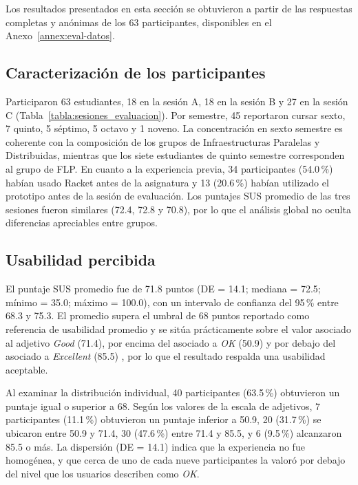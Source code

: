 Los resultados presentados en esta sección se obtuvieron a partir de las respuestas completas y anónimas de los 63 participantes, disponibles en el Anexo~\ref{annex:eval-datos}.

\subsection{Caracterización de los participantes}

Participaron 63 estudiantes, 18 en la sesión A, 18 en la sesión B y 27 en la sesión C (Tabla~\ref{tabla:sesiones_evaluacion}). Por semestre, 45 reportaron cursar sexto, 7 quinto, 5 séptimo, 5 octavo y 1 noveno. La concentración en sexto semestre es coherente con la composición de los grupos de Infraestructuras Paralelas y Distribuidas, mientras que los siete estudiantes de quinto semestre corresponden al grupo de FLP. En cuanto a la experiencia previa, 34 participantes (54.0\,\%) habían usado Racket antes de la asignatura y 13 (20.6\,\%) habían utilizado el prototipo antes de la sesión de evaluación. Los puntajes SUS promedio de las tres sesiones fueron similares (72.4, 72.8 y 70.8), por lo que el análisis global no oculta diferencias apreciables entre grupos.

\subsection{Usabilidad percibida}

El puntaje SUS promedio fue de 71.8 puntos (DE = 14.1; mediana = 72.5; mínimo = 35.0; máximo = 100.0), con un intervalo de confianza del 95\,\% entre 68.3 y 75.3. El promedio supera el umbral de 68 puntos reportado como referencia de usabilidad promedio \cite{sauro2016quantifying} y se sitúa prácticamente sobre el valor asociado al adjetivo \textit{Good} (71.4), por encima del asociado a \textit{OK} (50.9) y por debajo del asociado a \textit{Excellent} (85.5) \cite{bangor2009determining}, por lo que el resultado respalda una usabilidad aceptable.

Al examinar la distribución individual, 40 participantes (63.5\,\%) obtuvieron un puntaje igual o superior a 68. Según los valores de la escala de adjetivos, 7 participantes (11.1\,\%) obtuvieron un puntaje inferior a 50.9, 20 (31.7\,\%) se ubicaron entre 50.9 y 71.4, 30 (47.6\,\%) entre 71.4 y 85.5, y 6 (9.5\,\%) alcanzaron 85.5 o más. La dispersión (DE = 14.1) indica que la experiencia no fue homogénea, y que cerca de uno de cada nueve participantes la valoró por debajo del nivel que los usuarios describen como \textit{OK}.

